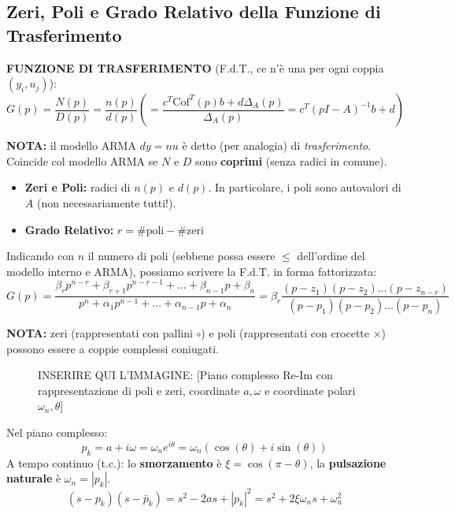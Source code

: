 \documentclass[11pt,a4paper]{article}
\begin{document}
\subsection{Zeri, Poli e Grado Relativo della Funzione di Trasferimento}

\textbf{FUNZIONE DI TRASFERIMENTO} (F.d.T., ce n'è una per ogni coppia $(y_i, u_j)$):
$$ G(p) = \frac{N(p)}{D(p)} = \frac{n(p)}{d(p)} \left( = \frac{c^T \text{Cof}^T(p) b + d \Delta_A(p)}{\Delta_A(p)} = c^T(pI - A)^{-1}b + d \right) $$

\textbf{NOTA:} il modello ARMA $dy = nu$ è detto (per analogia) di \textit{trasferimento}. Coincide col modello ARMA se $N$ e $D$ sono \textbf{coprimi} (senza radici in comune).

\begin{itemize}
    \item \textbf{Zeri e Poli:} radici di $n(p)$ e $d(p)$. In particolare, i poli sono autovalori di $A$ (non necessariamente tutti!).
    \item \textbf{Grado Relativo:} $r = \text{\#poli} - \text{\#zeri}$
\end{itemize}

Indicando con $n$ il numero di poli (sebbene possa essere $\le$ dell'ordine del modello interno e ARMA), possiamo scrivere la F.d.T. in forma fattorizzata:
$$ G(p) = \frac{\beta_r p^{n-r} + \beta_{r+1} p^{n-r-1} + \dots + \beta_{n-1} p + \beta_n}{p^n + \alpha_1 p^{n-1} + \dots + \alpha_{n-1} p + \alpha_n} = \beta_r \frac{(p - z_1)(p - z_2)\dots(p - z_{n-r})}{(p - p_1)(p - p_2)\dots(p - p_n)} $$

\textbf{NOTA:} zeri (rappresentati con pallini $\circ$) e poli (rappresentati con crocette $\times$) possono essere a coppie complessi coniugati.

\begin{figure}[htbp]
    \centering
    \vspace{4cm} %
    \caption{INSERIRE QUI L'IMMAGINE: [Piano complesso Re-Im con rappresentazione di poli e zeri, coordinate $a, \omega$ e coordinate polari $\omega_n, \theta$]}
\end{figure}

Nel piano complesso:
$$ p_k = a + i\omega = \omega_n e^{i\theta} = \omega_n (\cos(\theta) + i \sin(\theta)) $$
A tempo continuo (t.c.): lo \textbf{smorzamento} è $\xi = \cos(\pi - \theta)$, la \textbf{pulsazione naturale} è $\omega_n = |p_k|$.
$$ (s - p_k)(s - \bar{p}_k) = s^2 - 2as + |p_k|^2 = s^2 + 2\xi\omega_n s + \omega_n^2 $$
\end{document}
